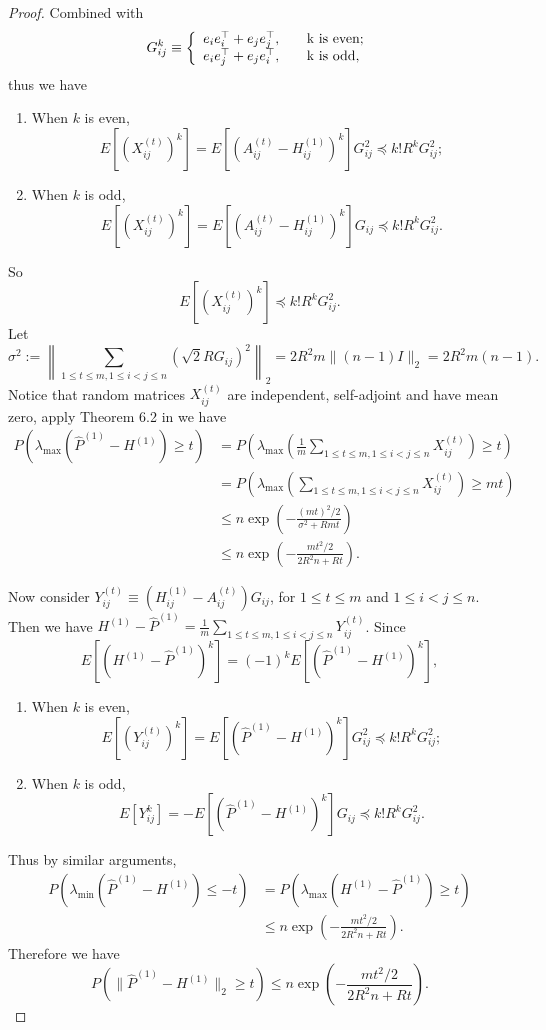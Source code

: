 \begin{proof}
Combined with
\[
    G_{ij}^k \equiv \left\{
    \begin{array}{l l}
        e_i e_i^{\top} + e_j e_j^{\top}, \quad & $k$ \text{ is even};\\
        e_i e_j^{\top} + e_j e_i^{\top}, \quad & $k$ \text{ is odd},
    \end{array}
    \right.
\]
thus we have
\begin{enumerate}
\item When $k$ is even,
\[
E[(X_{ij}^{(t)})^k] = E[(A^{(t)}_{ij} - H^{(1)}_{ij})^k] G_{ij}^2 \preceq k! R^k G_{ij}^2;
\]
\item When $k$ is odd,
\[
E[(X_{ij}^{(t)})^k] = E[(A^{(t)}_{ij} - H^{(1)}_{ij})^k] G_{ij} \preceq k! R^k G_{ij}^2.
\]
\end{enumerate}
So
\[
E[(X_{ij}^{(t)})^k] \preceq k! R^k G_{ij}^2.
\]
Let
\[
	\sigma^2 := \left\| \sum_{1 \le t \le m, 1 \le i < j \le n} (\sqrt{2} R G_{ij})^2 \right\|_2 = 2 R^2 m \| (n - 1) I \|_2 = 2 R^2 m (n - 1).
\]
Notice that random matrices $X_{ij}^{(t)}$ are independent, self-adjoint and have mean zero, apply Theorem 6.2 in \citep{tropp2012user} we have
\begin{align*}
	P \left( \lambda_{\max}(\hat{P}^{(1)} - H^{(1)}) \ge t \right)
	& = P \left( \lambda_{\max}\left(\frac{1}{m} \sum_{1 \le t \le m, 1 \le i < j \le n} X_{ij}^{(t)}\right) \ge t \right) \\
	& = P \left( \lambda_{\max}\left(\sum_{1 \le t \le m, 1 \le i < j \le n} X_{ij}^{(t)}\right) \ge m t \right) \\
	& \le n \exp \left( - \frac{(m t)^2/2}{\sigma^2 + R m t} \right) \\
	& \le n \exp \left( - \frac{m t^2/2}{2 R^2 n + R t} \right).
\end{align*}

Now consider $Y_{ij}^{(t)} \equiv \left( H_{ij}^{(1)} - A_{ij}^{(t)} \right) G_{ij}$, for $1 \le t \le m$ and $1 \le i < j \le n$. Then we have $H^{(1)} - \hat{P}^{(1)} = \frac{1}{m} \sum_{1 \le t \le m, 1 \le i < j \le n} Y_{ij}^{(t)}$.
Since
\[
	E[(H^{(1)} - \hat{P}^{(1)})^k]
    = (-1)^k E[(\hat{P}^{(1)} - H^{(1)})^k],
\]
\begin{enumerate}
\item When $k$ is even,
\[
E[(Y_{ij}^{(t)})^k] = E[(\hat{P}^{(1)} - H^{(1)})^k] G_{ij}^2 \preceq k! R^k G_{ij}^2;
\]
\item When $k$ is odd,
\[
E[Y_{ij}^k] = - E[(\hat{P}^{(1)} - H^{(1)})^k] G_{ij} \preceq k! R^k G_{ij}^2.
\]
\end{enumerate}
Thus by similar arguments,
\begin{align*}
	P \left( \lambda_{\min}(\hat{P}^{(1)} - H^{(1)}) \le -t \right) &
    = P \left( \lambda_{\max}(H^{(1)} - \hat{P}^{(1)}) \ge t \right) \\
    & \le n \exp \left( - \frac{m t^2/2}{2 R^2 n + R t} \right).
\end{align*}
Therefore we have
\[
	P \left( \| \hat{P}^{(1)} - H^{(1)} \|_2 \ge t \right)
    \le n \exp \left( - \frac{m t^2/2}{2 R^2 n + R t} \right).
\]


\end{proof}
